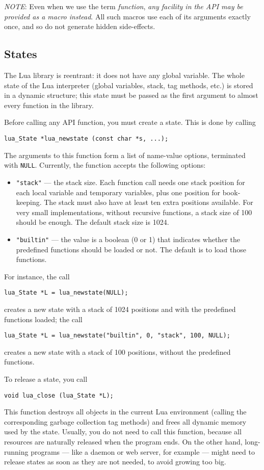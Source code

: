 \documentclass[11pt]{article}
\newcommand{\Deffunc}[1]{\index{#1}}
\newcommand{\NOTE}{\par\noindent\emph{NOTE}: }
\begin{document}
\NOTE
Even when we use the term \emph{function},
\emph{any facility in the API may be provided as a macro instead}.
All such macros use each of its arguments exactly once,
and so do not generate hidden side-effects.


\subsection{States} \label{mangstate}

The Lua library is reentrant:
it does not have any global variable.
The whole state of the Lua interpreter
(global variables, stack, tag methods, etc.)
is stored in a dynamic structure; \Deffunc{lua_State}
this state must be passed as the first argument to almost
every function in the library.

Before calling any API function,
you must create a state.
This is done by calling\Deffunc{lua_newstate}
\begin{verbatim}
lua_State *lua_newstate (const char *s, ...);
\end{verbatim}
The arguments to this function form a list of name-value options,
terminated with \verb|NULL|.
Currently, the function accepts the following options:
\begin{itemize}
\item \verb|"stack"| --- the stack size.
Each function call needs one stack position for each local variable
and temporary variables, plus one position for book-keeping.
The stack must also have at least ten extra positions available.
For very small implementations, without recursive functions,
a stack size of 100 should be enough.
The default stack size is 1024.

\item \verb|"builtin"| --- the value is a boolean (0 or 1) that
indicates whether the predefined functions should be loaded or not.
The default is to load those functions.
\end{itemize}
For instance, the call
\begin{verbatim}
lua_State *L = lua_newstate(NULL);
\end{verbatim}
creates a new state with a stack of 1024 positions
and with the predefined functions loaded;
the call
\begin{verbatim}
lua_State *L = lua_newstate("builtin", 0, "stack", 100, NULL);
\end{verbatim}
creates a new state with a stack of 100 positions,
without the predefined functions.

To release a state, you call
\begin{verbatim}
void lua_close (lua_State *L);
\end{verbatim}
This function destroys all objects in the current Lua environment
(calling the corresponding garbage collection tag methods)
and frees all dynamic memory used by the state.
Usually, you do not need to call this function,
because all resources are naturally released when the program ends.
On the other hand,
long-running programs ---
like a daemon or web server, for example ---
might need to release states as soon as they are not needed,
to avoid growing too big.
\end{document}
